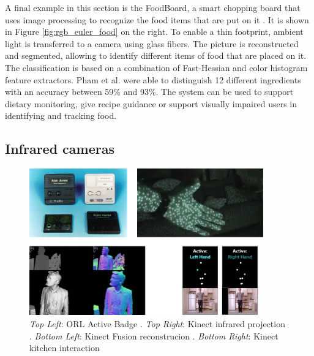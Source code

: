 A final example in this section is the FoodBoard, a smart chopping board that uses image processing to recognize the food items that are put on it \cite{pham2013foodboard}. It is shown in Figure \ref{fig:rgb_euler_food} on the right. To enable a thin footprint, ambient light is transferred to a camera using glass fibers. The picture is reconstructed and segmented, allowing to identify different items of food that are placed on it. The classification is based on a combination of Fast-Hessian and color histogram feature extractors. Pham et al. were able to distinguish 12 different ingredients with an accuracy between 59\% and 93\%. The system can be used to support dietary monitoring, give recipe guidance or support visually impaired users in identifying and tracking food.
\subsection{Infrared cameras}
\begin{figure}[h]
\centering
\includegraphics[width=0.9\textwidth]{images/rel_tech_infra}
\caption{\emph{Top Left}: ORL Active Badge  \cite{Weiser1991}. \emph{Top Right}: Kinect infrared projection \cite{zhang2012microsoft}. \emph{Bottom Left}: Kinect Fusion reconstrucion  \cite{Izadi2011}. \emph{Bottom Right}: Kinect kitchen interaction \cite{panger2012kinect}}
\label{fig:rel_tech_infra}
\end{figure}
